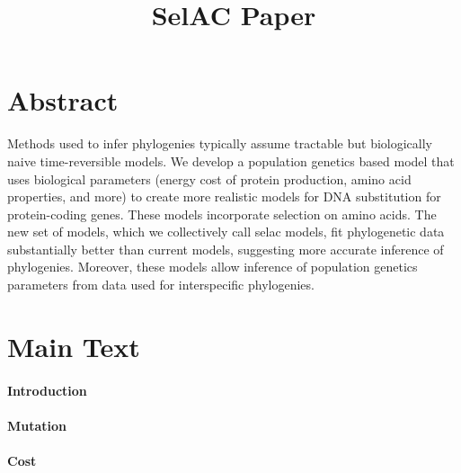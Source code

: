 \documentclass{article}
\title{SelAC Paper}
\date{}
\begin{document}
\maketitle




\section*{Abstract}
Methods used to infer phylogenies typically assume tractable but biologically naive time-reversible models.
We develop a population genetics based model that uses biological parameters (energy cost of protein production, amino acid properties, and more) to create more realistic models for DNA substitution for protein-coding genes. 
These models incorporate selection on amino acids.
The new set of models, which we collectively call selac models, fit phylogenetic data substantially better than current models, suggesting more accurate inference of phylogenies.
Moreover, these models allow inference of population genetics parameters from data used for interspecific phylogenies.

\section*{Main Text}
\paragraph*{Introduction}


\paragraph*{Mutation}

\paragraph*{Cost}
\end{document}
